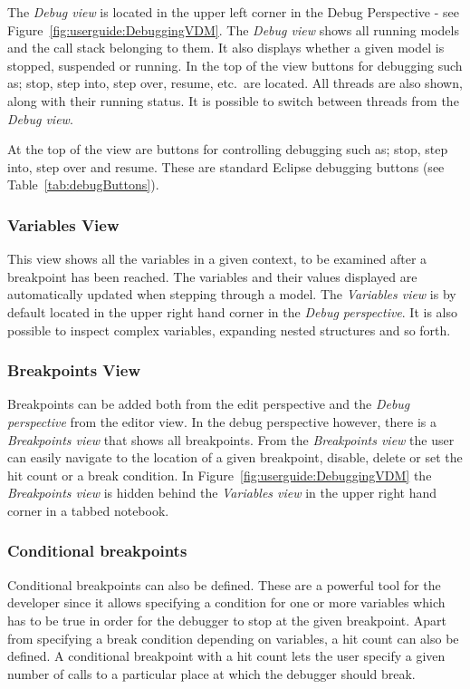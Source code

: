 \documentclass{overturerep}
\begin{document}
{The \emph{Debug view} is located in the upper left corner in the Debug Perspective -
see Figure~\ref{fig:userguide:DebuggingVDM}. The \emph{Debug view} shows all running
models and the call stack belonging to them. It also displays whether a given model is
stopped, suspended or running. In the top of the view buttons
for debugging such as; stop, step into, step over, resume, etc.\ are located.
All threads are also shown, along with their running status. It is possible to
switch between threads from the \emph{Debug view}.

At the top of the view are buttons for controlling debugging such as; stop, step
into, step over and resume. These are standard Eclipse debugging
buttons (see Table~\ref{tab:debugButtons}).

\subsubsection{Variables View}
 
This view shows all the variables in a given context, to be examined after a breakpoint has been
reached. The variables and their values displayed are automatically updated when
stepping through a model. The \emph{Variables view} is by default located in the upper
right hand corner in the \emph{Debug perspective}. It is also possible to inspect complex variables,
expanding nested structures and so forth.

\subsubsection{Breakpoints View}

Breakpoints can be added both from the edit perspective and the \emph{Debug perspective}
from the editor view. In the debug perspective however, there is a \emph{Breakpoints
view} that shows all breakpoints. From the \emph{Breakpoints view} the user can easily
navigate to the location of a given breakpoint, disable, delete or set the hit
count or a break condition. In Figure~\ref{fig:userguide:DebuggingVDM} the
\emph{Breakpoints view} is hidden behind the \emph{Variables view} in the upper right hand 
corner in a tabbed notebook. 

\subsubsection{Conditional breakpoints}
\label{sec:userguide:breakpoints}

Conditional breakpoints can also be defined. These are a powerful tool for the
developer since it allows specifying a condition for one or more variables which
has to be true in order for the debugger to stop at the given breakpoint. Apart
from specifying a break condition depending on variables, a hit count can also be
defined. A conditional breakpoint with a hit count lets the user specify a given
number of calls to a particular place at which the debugger should break.

}
\end{document}
